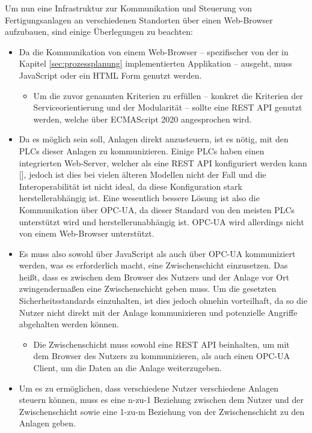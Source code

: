 Um nun eine Infrastruktur zur Kommunikation und Steuerung von Fertigungsanlagen an verschiedenen Standorten über einen Web-Browser aufzubauen, sind einige Überlegungen zu beachten:
%
\begin{itemize}
    \item Da die Kommunikation von einem Web-Browser – spezifischer von der in Kapitel \ref{sec:prozessplanung} implementierten Applikation – ausgeht, muss JavaScript oder ein HTML Form genutzt werden.
    \begin{itemize}
        \item Um die zuvor genannten Kriterien zu erfüllen – konkret die Kriterien der Serviceorientierung und der Modularität – sollte eine REST API genutzt werden, welche über ECMAScript 2020 angesprochen wird.
    \end{itemize}
    \item Da es möglich sein soll, Anlagen direkt anzusteuern, ist es nötig, mit den PLCs dieser Anlagen zu kommunizieren. Einige PLCs haben einen integrierten Web-Server, welcher als eine REST API konfiguriert werden kann [\cite{plcRest}], jedoch ist dies bei vielen älteren Modellen nicht der Fall und die Interoperabilität ist nicht ideal, da diese Konfiguration stark herstellerabhängig ist. Eine wesentlich bessere Lösung ist also die Kommunikation über OPC-UA, da dieser Standard von den meisten PLCs unterstützt wird und herstellerunabhängig ist. OPC-UA wird allerdings nicht von einem Web-Browser unterstützt.
    \item Es muss also sowohl über JavaScript als auch über OPC-UA kommuniziert werden, was es erforderlich macht, eine Zwischenschicht einzusetzen. Das heißt, dass es zwischen dem Browser des Nutzers und der Anlage vor Ort zwingendermaßen eine Zwischenschicht geben muss. Um die gesetzten Sicherheitsstandards einzuhalten, ist dies jedoch ohnehin vorteilhaft, da so die Nutzer nicht direkt mit der Anlage kommunizieren und potenzielle Angriffe abgehalten werden können.
    \begin{itemize}
        \item Die Zwischenschicht muss sowohl eine REST API beinhalten, um mit dem Browser des Nutzers zu kommunizieren, als auch einen OPC-UA Client, um die Daten an die Anlage weiterzugeben.
    \end{itemize}
    \item Um es zu ermöglichen, dass verschiedene Nutzer verschiedene Anlagen steuern können, muss es eine n-zu-1 Beziehung zwischen dem Nutzer und der Zwischenschicht sowie eine 1-zu-m Beziehung von der Zwischenschicht zu den Anlagen geben.
\end{itemize}

